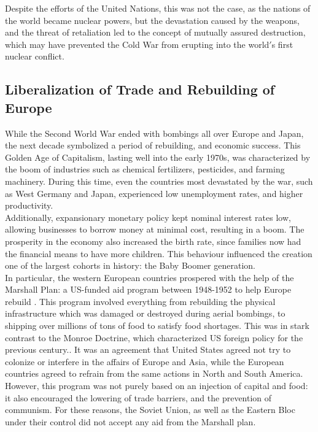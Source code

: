 \documentclass[12pt]{article}
\begin{document}
Despite the efforts of the United Nations, this was not the case, as the nations of the world became nuclear powers, but the devastation caused by the weapons, and the threat of retaliation led to the concept of mutually assured destruction, which may have prevented the Cold War from erupting into the world$'$s first nuclear conflict.

\subsection{Liberalization of Trade and Rebuilding of Europe}

While the Second World War ended with bombings all over Europe and Japan, the next decade symbolized a period of rebuilding, and economic success. This Golden Age of Capitalism, lasting well into the early 1970s, was characterized by the boom of industries such as chemical fertilizers, pesticides, and farming machinery\cite{9}. During this time, even the countries most devastated by the war, such as West Germany and Japan, experienced low unemployment rates, and higher productivity\cite{10}.\\

Additionally, expansionary monetary policy kept nominal interest rates low, allowing businesses to borrow money at minimal cost, resulting in a boom\cite{10}. The prosperity in the economy also increased the birth rate, since families now had the financial means to have more children. This behaviour influenced the creation one of the largest cohorts in history: the Baby Boomer generation\cite{10}.\\

In particular, the western European countries prospered with the help of the Marshall Plan: a US-funded aid program between 1948-1952 to help Europe rebuild \cite{11}. This program involved everything from rebuilding the physical infrastructure which was damaged or destroyed during aerial bombings, to shipping over millions of tons of food to satisfy food shortages. This was in stark contrast to the Monroe Doctrine, which characterized US foreign policy for the previous century.. It was an agreement that United States agreed not try to colonize or interfere in the affairs of Europe and Asia, while the European countries agreed to refrain from the same actions in North and South America\cite{12}. However, this program was not purely based on an injection of capital and food: it also encouraged the lowering of trade barriers, and the prevention of communism\cite{11}. For these reasons, the Soviet Union, as well as the Eastern Bloc under their control did not accept any aid from the Marshall plan\cite{11}.
\end{document}
